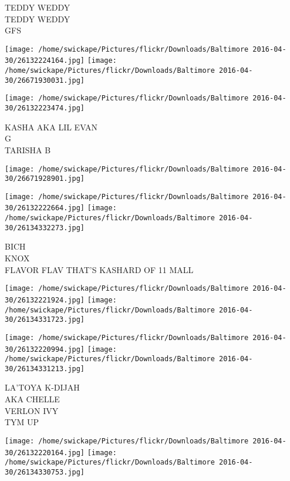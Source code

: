 \documentclass[10pt,letterpaper]{article}
\begin{document}
TEDDY WEDDY\\
TEDDY WEDDY\\
GFS\\
\pagebreak

\texttt{[image: /home/swickape/Pictures/flickr/Downloads/Baltimore 2016-04-30/26132224164.jpg]}
\texttt{[image: /home/swickape/Pictures/flickr/Downloads/Baltimore 2016-04-30/26671930031.jpg]}

\texttt{[image: /home/swickape/Pictures/flickr/Downloads/Baltimore 2016-04-30/26132223474.jpg]}

KASHA AKA LIL EVAN\\
G\\
TARISHA B\\
\pagebreak

\texttt{[image: /home/swickape/Pictures/flickr/Downloads/Baltimore 2016-04-30/26671928901.jpg]}

\vspace{0.25in}
\texttt{[image: /home/swickape/Pictures/flickr/Downloads/Baltimore 2016-04-30/26132222664.jpg]}
\texttt{[image: /home/swickape/Pictures/flickr/Downloads/Baltimore 2016-04-30/26134332273.jpg]}

BICH\\
KNOX\\
FLAVOR FLAV THAT'S KASHARD OF 11 MALL\\
\pagebreak

\texttt{[image: /home/swickape/Pictures/flickr/Downloads/Baltimore 2016-04-30/26132221924.jpg]}
\texttt{[image: /home/swickape/Pictures/flickr/Downloads/Baltimore 2016-04-30/26134331723.jpg]}

\texttt{[image: /home/swickape/Pictures/flickr/Downloads/Baltimore 2016-04-30/26132220994.jpg]}
\texttt{[image: /home/swickape/Pictures/flickr/Downloads/Baltimore 2016-04-30/26134331213.jpg]}

LA'TOYA K{-}DIJAH\\
AKA CHELLE\\
VERLON IVY\\
TYM UP\\
\pagebreak

\texttt{[image: /home/swickape/Pictures/flickr/Downloads/Baltimore 2016-04-30/26132220164.jpg]}
\texttt{[image: /home/swickape/Pictures/flickr/Downloads/Baltimore 2016-04-30/26134330753.jpg]}
\end{document}
